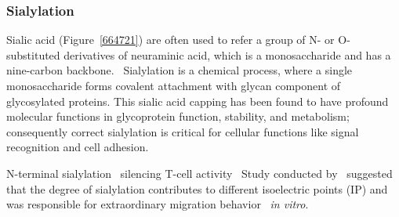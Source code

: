 \subsubsection {Sialylation}
Sialic acid (Figure~\ref{664721}) are often used to refer a group of N- or O-substituted derivatives of neuraminic acid, which is a monosaccharide and has a nine-carbon backbone.~\cite{Vocadlo_2009} Sialylation is a chemical process, where a single monosaccharide forms covalent attachment with glycan component of glycosylated proteins. This sialic acid capping has been found to have profound molecular functions in glycoprotein function, stability, and metabolism; consequently correct sialylation is critical for cellular functions like signal recognition and cell adhesion.~\cite{Bhide_2016}
\par 
N-terminal sialylation~\cite{Stehling_1999}
silencing T-cell activity~\cite{K_hne_1996} 
Study conducted by~\citet{Schmauser1999} suggested that the degree of  sialylation contributes to different isoelectric points (IP) and was responsible for extraordinary migration behavior ~\textit{in vitro}.